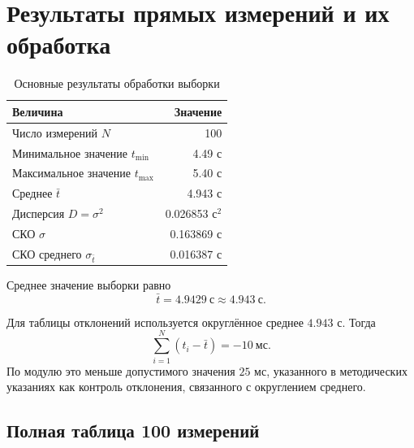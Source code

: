 \documentclass[12pt]{article}
\begin{document}
    \section{Результаты прямых измерений и их обработка}

	\begin{table}[H]
    	\centering
    	\begin{xltabular}{\textwidth}{@{}Xr@{}}
        	\toprule
        	Величина & Значение\\
        	\midrule
        	Число измерений $N$ & 100\\
        	Минимальное значение $t_{\min}$ & 4.49 с\\
        	Максимальное значение $t_{\max}$ & 5.40 с\\
        	Среднее $\bar t$ & 4.943 с\\
        	Дисперсия $D = \sigma^2$ & 0.026853 с$^2$\\
        	СКО $\sigma$ & 0.163869 с\\
        	СКО среднего $\sigma_{\bar t}$ & 0.016387 с\\
        	\bottomrule
    	\end{xltabular}
		\caption{Основные результаты обработки выборки}
    	\label{tab:main}
	\end{table}

	Среднее значение выборки равно
	\[
		\bar t = 4.9429 \ \text{с} \approx 4.943 \ \text{с}.
	\]

	Для таблицы отклонений используется округлённое среднее $4.943$ с. Тогда
	\[
		\sum_{i = 1}^{N} (t_i - \bar t) = -10 \ \text{мс}.
	\]
	По модулю это меньше допустимого значения $25$ мс, указанного в методических указаниях как контроль отклонения, связанного с округлением среднего.

	\subsection{Полная таблица 100 измерений}
\end{document}
